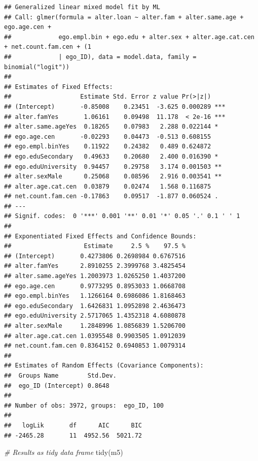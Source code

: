 \documentclass[
]{book}
\newenvironment{Shaded}{\begin{snugshade}}{\end{snugshade}}
\newcommand{\CommentTok}[1]{\textcolor[rgb]{0.56,0.35,0.01}{\textit{#1}}}
\newcommand{\FunctionTok}[1]{\textcolor[rgb]{0.00,0.00,0.00}{#1}}
\newcommand{\NormalTok}[1]{#1}
\begin{document}
\begin{verbatim}
## Generalized linear mixed model fit by ML
## Call: glmer(formula = alter.loan ~ alter.fam + alter.same.age + ego.age.cen +
##             ego.empl.bin + ego.edu + alter.sex + alter.age.cat.cen + net.count.fam.cen + (1
##             | ego_ID), data = model.data, family = binomial("logit"))
## 
## Estimates of Fixed Effects:
##                   Estimate Std. Error z value Pr(>|z|)    
## (Intercept)       -0.85008    0.23451  -3.625 0.000289 ***
## alter.famYes       1.06161    0.09498  11.178  < 2e-16 ***
## alter.same.ageYes  0.18265    0.07983   2.288 0.022144 *  
## ego.age.cen       -0.02293    0.04473  -0.513 0.608155    
## ego.empl.binYes    0.11922    0.24382   0.489 0.624872    
## ego.eduSecondary   0.49633    0.20680   2.400 0.016390 *  
## ego.eduUniversity  0.94457    0.29758   3.174 0.001503 ** 
## alter.sexMale      0.25068    0.08596   2.916 0.003541 ** 
## alter.age.cat.cen  0.03879    0.02474   1.568 0.116875    
## net.count.fam.cen -0.17863    0.09517  -1.877 0.060524 .  
## ---
## Signif. codes:  0 '***' 0.001 '**' 0.01 '*' 0.05 '.' 0.1 ' ' 1
## 
## Exponentiated Fixed Effects and Confidence Bounds:
##                    Estimate     2.5 %    97.5 %
## (Intercept)       0.4273806 0.2698984 0.6767516
## alter.famYes      2.8910255 2.3999768 3.4825454
## alter.same.ageYes 1.2003973 1.0265250 1.4037200
## ego.age.cen       0.9773295 0.8953033 1.0668708
## ego.empl.binYes   1.1266164 0.6986086 1.8168463
## ego.eduSecondary  1.6426831 1.0952898 2.4636473
## ego.eduUniversity 2.5717065 1.4352318 4.6080878
## alter.sexMale     1.2848996 1.0856839 1.5206700
## alter.age.cat.cen 1.0395548 0.9903505 1.0912039
## net.count.fam.cen 0.8364152 0.6940853 1.0079314
## 
## Estimates of Random Effects (Covariance Components):
##  Groups Name        Std.Dev.
##  ego_ID (Intercept) 0.8648  
## 
## Number of obs: 3972, groups:  ego_ID, 100
## 
##   logLik       df      AIC      BIC 
## -2465.28       11  4952.56  5021.72
\end{verbatim}

\begin{Shaded}
\begin{Highlighting}[]
\CommentTok{\# Results as tidy data frame}
\FunctionTok{tidy}\NormalTok{(m5)}
\end{Highlighting}
\end{Shaded}
\end{document}
